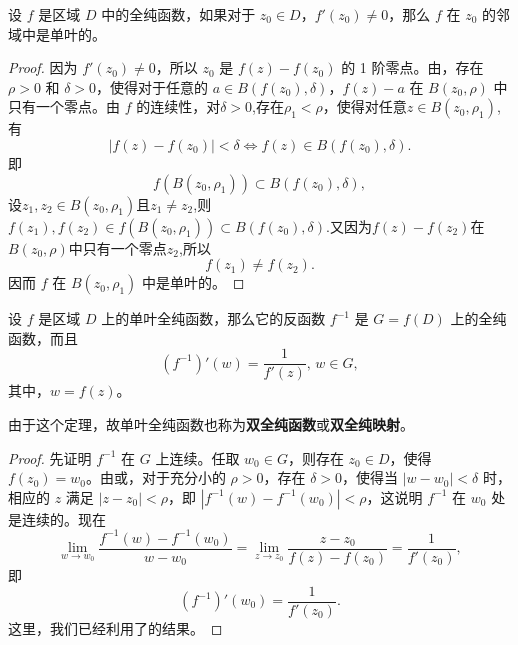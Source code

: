 \documentclass[../../main.tex]{subfiles}%
\begin{document}
\begin{theorem}\label{theorem:定理4.4.8}
设 \( f \) 是区域 \( D \) 中的全纯函数，如果对于 \( z_0 \in D \)，\( f'(z_0) \neq 0 \)，那么 \( f \) 在 \( z_0 \) 的邻域中是单叶的。
\end{theorem}
\begin{proof}

因为 \( f'(z_0) \neq 0 \)，所以 \( z_0 \) 是 \( f(z) - f(z_0) \) 的 1 阶零点。由，存在 \( \rho > 0 \) 和 \( \delta > 0 \)，使得对于任意的 \( a \in B(f(z_0), \delta) \)，\( f(z) - a \) 在 \( B(z_0, \rho) \) 中只有一个零点。由 \( f \) 的连续性，对$\delta>0$,存在\( \rho_1 < \rho \)，使得对任意$z\in B(z_0,\rho_1)$,有
\[
|f(z)-f(z_0)|<\delta \iff f(z)\in B(f(z_0),\delta).
\]
即
\[
f(B(z_0, \rho_1)) \subset B(f(z_0), \delta),
\]
设$z_1,z_2\in B(z_0,\rho_1)$且$z_1\ne z_2$,则$f(z_1),f(z_2)\in f(B(z_0, \rho_1)) \subset B(f(z_0), \delta)$.又因为$f(z)-f(z_2)$在$B(z_0,\rho)$中只有一个零点$z_2$,所以
\[
f(z_1)\ne f(z_2).
\]
因而 \( f \) 在 \( B(z_0, \rho_1) \) 中是单叶的。 

\end{proof}

\begin{theorem}\label{theorem:定理4.4.9}
设 \( f \) 是区域 \( D \) 上的单叶全纯函数，那么它的反函数 \( f^{-1} \) 是 \( G = f(D) \) 上的全纯函数，而且
\[
(f^{-1})'(w) = \frac{1}{f'(z)}, \, w \in G,
\]
其中，\( w = f(z) \)。
\end{theorem}
\begin{note}
由于这个定理，故单叶全纯函数也称为\textbf{双全纯函数}或\textbf{双全纯映射}。
\end{note}
\begin{proof}

先证明 \( f^{-1} \) 在 \( G \) 上连续。任取 \( w_0 \in G \)，则存在 \( z_0 \in D \)，使得 \( f(z_0) = w_0 \)。由或，对于充分小的 \( \rho > 0 \)，存在 \( \delta > 0 \)，使得当 \( |w - w_0| < \delta \) 时，相应的 \( z \) 满足 \( |z - z_0| < \rho \)，即 \( |f^{-1}(w) - f^{-1}(w_0)| < \rho \)，这说明 \( f^{-1} \) 在 \( w_0 \) 处是连续的。现在
\[
\lim_{w \to w_0} \frac{f^{-1}(w) - f^{-1}(w_0)}{w - w_0} = \lim_{z \to z_0} \frac{z - z_0}{f(z) - f(z_0)} = \frac{1}{f'(z_0)},
\]
即
\[
(f^{-1})'(w_0) = \frac{1}{f'(z_0)}.
\]
这里，我们已经利用了的结果。 

\end{proof}
\end{document}
